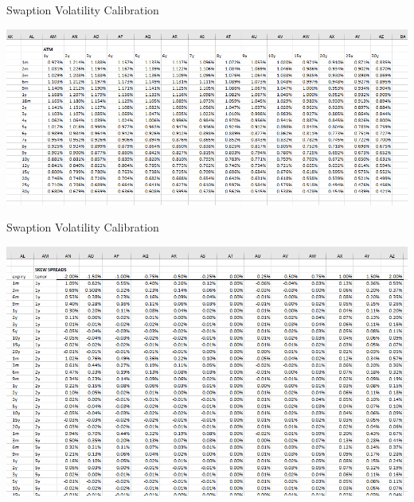 \documentclass{beamer}
\begin{document}
\begin{frame}{Swaption Volatility Calibration}
  \begin{center}
    \includegraphics[width=1.\linewidth]{images/atm_vol}
  \end{center}
\end{frame}

\begin{frame}{Swaption Volatility Calibration}
  \begin{center}
    \includegraphics[width=1.\linewidth]{images/skews}
  \end{center}
\end{frame}
\end{document}
